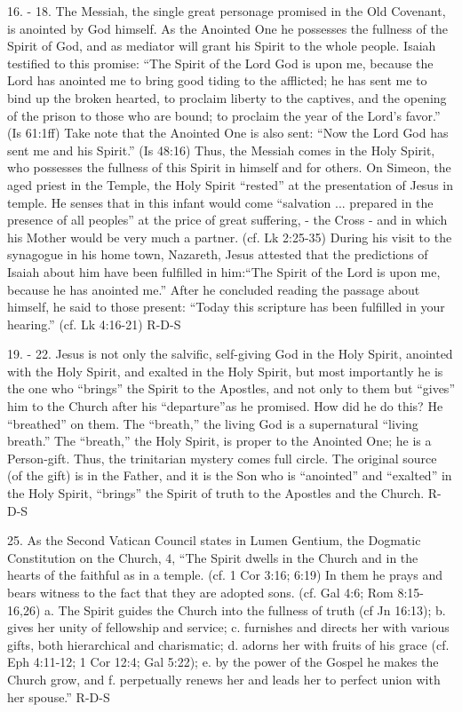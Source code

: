 \documentclass[oneside]{book}
\begin{document}
16. - 18. The Messiah, the single great personage promised in the Old Covenant,
is anointed by God himself. As the Anointed One he possesses the fullness of the
Spirit of God, and as mediator will grant his Spirit to the whole people. Isaiah
testified to this promise: ``The Spirit of the Lord God is upon me, because the
Lord has anointed me to bring good tiding to the afflicted; he has sent me to
bind up the broken hearted, to proclaim liberty to the captives, and the opening
of the prison to those who are bound; to proclaim the year of the Lord's
favor.'' (Is 61:1ff) Take note that the Anointed One is also sent: ``Now the
Lord God has sent me and his Spirit.'' (Is 48:16) Thus, the Messiah comes in the
Holy Spirit, who possesses the fullness of this Spirit in himself and for
others. On Simeon, the aged priest in the Temple, the Holy Spirit ``rested'' at
the presentation of Jesus in temple. He senses that in this infant would come
``salvation ... prepared in the presence of all peoples'' at the price of great
suffering, - the Cross - and in which his Mother would be very much a
partner. (cf. Lk 2:25-35) During his visit to the synagogue in his home town,
Nazareth, Jesus attested that the predictions of Isaiah about him have been
fulfilled in him:``The Spirit of the Lord is upon me, because he has anointed
me.'' After he concluded reading the passage about himself, he said to those
present: ``Today this scripture has been fulfilled in your hearing.'' (cf. Lk
4:16-21)
R-D-S

19. - 22. Jesus is not only the salvific, self-giving God in the Holy Spirit,
anointed with the Holy Spirit, and exalted in the Holy Spirit, but most
importantly he is the one who ``brings'' the Spirit to the Apostles, and not
only to them but ``gives'' him to the Church after his ``departure''as he
promised. How did he do this? He ``breathed'' on them. The ``breath,'' the
living God is a supernatural ``living breath.'' The ``breath,'' the Holy Spirit,
is proper to the Anointed One; he is a Person-gift. Thus, the trinitarian
mystery comes full circle. The original source (of the gift) is in the Father,
and it is the Son who is ``anointed'' and ``exalted'' in the Holy Spirit,
``brings'' the Spirit of truth to the Apostles and the Church.
R-D-S

25. As the Second Vatican Council states in Lumen Gentium, the Dogmatic
Constitution on the Church, 4, ``The Spirit dwells in the Church and in the
hearts of the faithful as in a temple. (cf. 1 Cor 3:16; 6:19) In them he prays
and bears witness to the fact that they are adopted sons. (cf. Gal 4:6; Rom
8:15-16,26) a. The Spirit guides the Church into the fullness of truth (cf Jn
16:13); b. gives her unity of fellowship and service; c. furnishes and directs
her with various gifts, both hierarchical and charismatic; d. adorns her with
fruits of his grace (cf. Eph 4:11-12; 1 Cor 12:4; Gal 5:22); e. by the power of
the Gospel he makes the Church grow, and f.  perpetually renews her and leads
her to perfect union with her spouse.''
R-D-S
\end{document}
